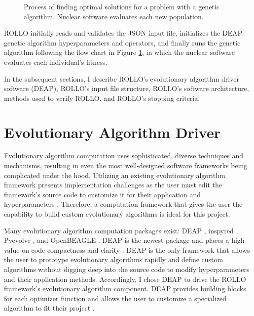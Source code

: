\begin{figure}[]
    \caption{Process of finding optimal solutions for a problem with a 
    genetic algorithm. Nuclear software evaluates each new population.}
    \label{fig:genetic_alg_nuclear}
\end{figure}
\gls{ROLLO} initially reads and validates the JSON input 
file, initializes the \gls{DEAP} \cite{fortin_deap_2012} genetic algorithm 
hyperparameters and operators, and finally runs the genetic algorithm following 
the flow chart in Figure \ref{fig:genetic_alg_nuclear}, in which the nuclear 
software evaluates each individual's fitness. 

In the subsequent sections, I describe \gls{ROLLO}'s evolutionary algorithm driver 
software (DEAP), \gls{ROLLO}'s input file structure, \gls{ROLLO}'s software 
architecture, methods used to verify \gls{ROLLO}, and \gls{ROLLO}'s stopping 
criteria. 

\section{Evolutionary Algorithm Driver}
Evolutionary algorithm computation uses sophisticated, diverse techniques 
and mechanisms, resulting in even the most well-designed software frameworks 
being complicated under the hood. 
Utilizing an existing evolutionary algorithm framework presents implementation 
challenges as the user must edit the framework's source code to customize it for their 
application and hyperparameters \cite{fortin_deap_2012}. 
Therefore, a computation framework that gives the user the capability to build 
custom evolutionary algorithms is ideal for this project.

Many evolutionary algorithm computation packages exist: 
\gls{DEAP} \cite{fortin_deap_2012}, inspyred \cite{garrett_inspyred_2014}, 
Pyevolve \cite{perone_pyevolve_2009}, and OpenBEAGLE \cite{gagne_open_2002}.
\gls{DEAP} is the newest package and places a high value on code 
compactness and clarity \cite{fortin_deap_2012}. 
\gls{DEAP} is the only framework that allows the user to prototype evolutionary 
algorithms rapidly and define custom algorithms without digging deep into 
the source code to modify hyperparameters and their application methods.
Accordingly, I chose \gls{DEAP} to drive the \gls{ROLLO} framework's 
evolutionary algorithm component. 
\gls{DEAP} provides building blocks for each optimizer function and allows the 
user to customize a specialized algorithm to fit their project \cite{fortin_deap_2012}.

